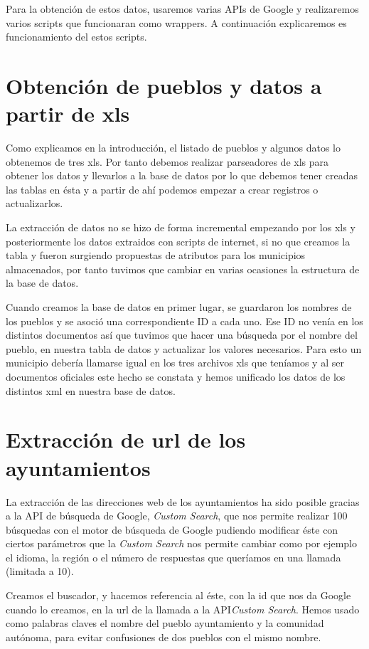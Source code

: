 Para la obtención de estos datos, usaremos varias APIs de Google y realizaremos varios scripts que funcionaran como wrappers.
A continuación explicaremos es funcionamiento del estos scripts.

\section{Obtención de pueblos y datos a partir de xls}
	Como explicamos en la introducción, el listado de pueblos y algunos datos lo obtenemos de tres xls. Por tanto debemos realizar parseadores de xls para obtener los datos y llevarlos a la base de datos por lo que debemos tener creadas las tablas en ésta y a partir de ahí podemos empezar a crear registros o actualizarlos. 
	
La extracción de datos no se hizo de forma incremental empezando por los xls y posteriormente los datos extraidos con scripts de internet, si no que creamos la tabla y fueron surgiendo propuestas de atributos para los municipios almacenados, por tanto tuvimos que cambiar en varias ocasiones la estructura de la base de datos.

Cuando creamos la base de datos en primer lugar, se guardaron los nombres de los pueblos y se asoció una correspondiente ID a cada uno. Ese ID no venía en los distintos documentos así que tuvimos que hacer una búsqueda por el nombre del pueblo, en nuestra tabla de datos y actualizar los valores necesarios. Para esto un municipio debería llamarse igual en los tres archivos xls que teníamos y al ser documentos oficiales este hecho se constata y hemos unificado los datos de los distintos xml en nuestra base de datos.

\section{Extracción de url de los ayuntamientos}

La extracción de las direcciones web de los ayuntamientos ha sido posible gracias a la API de búsqueda de Google, \textit{Custom Search}, que nos permite realizar 100 búsquedas con el motor de búsqueda de Google pudiendo modificar éste con ciertos parámetros que la \textit{Custom Search} nos permite cambiar como por ejemplo el idioma, la región o el número de respuestas que queríamos en una llamada (limitada a 10).

Creamos el buscador, y hacemos referencia al éste, con la id que nos da Google cuando lo creamos, en la url de la llamada a la API\textit{Custom Search}. Hemos usado como palabras claves el nombre del pueblo ayuntamiento y la comunidad autónoma, para evitar confusiones de dos pueblos con el mismo nombre.

